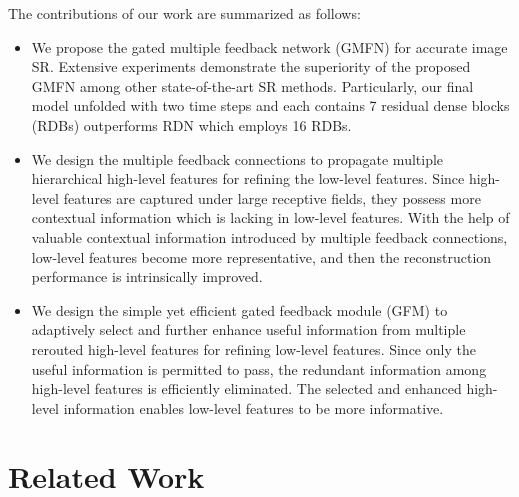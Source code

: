 \documentclass{bmvc2k}
\begin{document}
	The contributions of our work are summarized as follows:
	\begin{itemize}
		\vspace{-\topsep}
		\setlength{\itemsep}{0pt}
		
		\item We propose the gated multiple feedback network (GMFN) for accurate image SR. Extensive experiments demonstrate the superiority of the proposed GMFN among other state-of-the-art SR methods. Particularly, our final model unfolded with two time steps and each contains 7 residual dense blocks (RDBs) outperforms RDN\cite{zhang2018residual} which employs 16 RDBs.
		
		\item We design the multiple feedback connections to propagate multiple hierarchical high-level features for refining the low-level features. Since high-level features are captured under large receptive fields, they possess more contextual information which is lacking in low-level features. With the help of valuable contextual information introduced by multiple feedback connections, low-level features become more representative, and then the reconstruction performance is intrinsically improved. 
		
		\item We design the simple yet efficient gated feedback module (GFM) to adaptively select and further enhance useful information from multiple rerouted high-level features for refining low-level features. Since only the useful information is permitted to pass, the redundant information among high-level features is efficiently eliminated. The selected and enhanced high-level information enables low-level features to be more informative. 
		
	\end{itemize}
	\vspace{-\topsep}
			\vspace{-4mm}
	\section{Related Work}
	\label{sec:related_work}
	\setlength{\parskip}{0\baselineskip}
\end{document}
